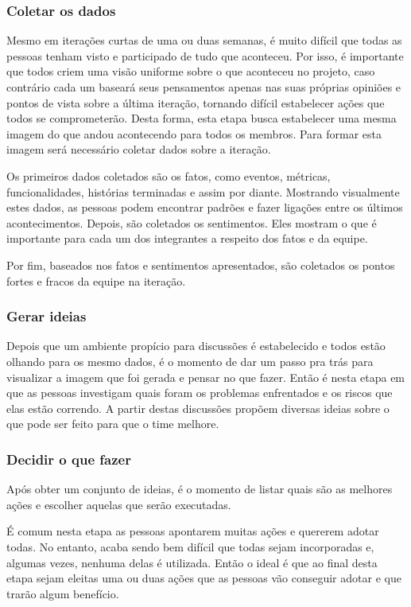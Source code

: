 \subsubsection*{Coletar os dados}

Mesmo em iterações curtas de uma ou duas semanas, é muito difícil que todas as pessoas tenham visto e participado de tudo que aconteceu. Por isso, é importante que todos criem uma visão uniforme sobre o que aconteceu no projeto, caso contrário cada um baseará seus pensamentos apenas nas suas próprias opiniões e pontos de vista sobre a última iteração, tornando difícil estabelecer ações que todos se comprometerão. Desta forma, esta etapa busca estabelecer uma mesma imagem do que andou acontecendo para todos os membros. Para formar esta imagem será necessário coletar dados sobre a iteração.
    
Os primeiros dados coletados são os fatos, como eventos, métricas, funcionalidades, histórias terminadas e assim por diante. Mostrando visualmente estes dados, as pessoas podem encontrar padrões e fazer ligações entre os últimos acontecimentos. Depois, são coletados os sentimentos. Eles mostram o que é importante para cada um dos integrantes a respeito dos fatos e da equipe. 

Por fim, baseados nos fatos e sentimentos apresentados, são coletados os pontos fortes e fracos da equipe na iteração.

\subsubsection*{Gerar ideias}

Depois que um ambiente propício para discussões é estabelecido e todos estão olhando para os mesmo dados, é o momento de dar um passo pra trás para visualizar a imagem que foi gerada e pensar no que fazer. Então é nesta etapa em que as pessoas investigam quais foram os problemas enfrentados e os riscos que elas estão correndo. A partir destas discussões propõem diversas ideias sobre o que pode ser feito para que o time melhore.

\subsubsection*{Decidir o que fazer}

Após obter um conjunto de ideias, é o momento de listar quais são as melhores ações e escolher aquelas que serão executadas.

É comum nesta etapa as pessoas apontarem muitas ações e quererem adotar todas. No entanto, acaba sendo bem difícil que todas sejam incorporadas e, algumas vezes, nenhuma delas é utilizada. Então o ideal é que ao final desta etapa sejam eleitas uma ou duas ações que as pessoas vão conseguir adotar e que trarão algum benefício.


